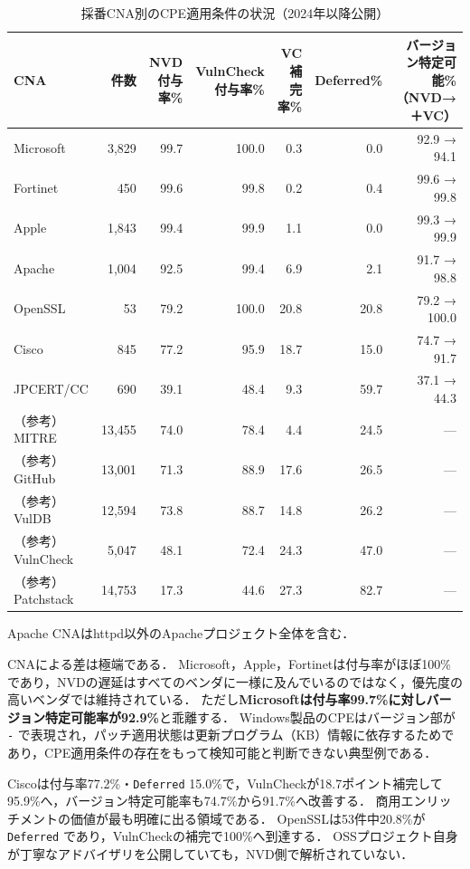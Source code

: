\begin{table}[htbp]
  \caption{採番CNA別のCPE適用条件の状況（2024年以降公開）}
  \label{tab:cna}
  \begin{center}
  \begin{tabular}{lrrrrrr}
    \hline
    CNA & 件数 & NVD付与率\% & VulnCheck付与率\% & VC補完率\% & Deferred\% & バージョン特定可能\%（NVD→＋VC） \\
    \hline
    Microsoft & 3,829 & 99.7 & 100.0 & 0.3 & 0.0 & 92.9 → 94.1 \\
    Fortinet & 450 & 99.6 & 99.8 & 0.2 & 0.4 & 99.6 → 99.8 \\
    Apple & 1,843 & 99.4 & 99.9 & 1.1 & 0.0 & 99.3 → 99.9 \\
    Apache & 1,004 & 92.5 & 99.4 & 6.9 & 2.1 & 91.7 → 98.8 \\
    OpenSSL & 53 & 79.2 & 100.0 & 20.8 & 20.8 & 79.2 → 100.0 \\
    Cisco & 845 & 77.2 & 95.9 & 18.7 & 15.0 & 74.7 → 91.7 \\
    JPCERT/CC & 690 & 39.1 & 48.4 & 9.3 & 59.7 & 37.1 → 44.3 \\
    \hline
    （参考）MITRE & 13,455 & 74.0 & 78.4 & 4.4 & 24.5 & --- \\
    （参考）GitHub & 13,001 & 71.3 & 88.9 & 17.6 & 26.5 & --- \\
    （参考）VulDB & 12,594 & 73.8 & 88.7 & 14.8 & 26.2 & --- \\
    （参考）VulnCheck & 5,047 & 48.1 & 72.4 & 24.3 & 47.0 & --- \\
    （参考）Patchstack & 14,753 & 17.3 & 44.6 & 27.3 & 82.7 & --- \\
    \hline
  \end{tabular}
  \end{center}
  \footnotesize
  Apache CNAはhttpd以外のApacheプロジェクト全体を含む．
\end{table}

CNAによる差は極端である．
Microsoft，Apple，Fortinetは付与率がほぼ100\%であり，NVDの遅延はすべてのベンダに一様に及んでいるのではなく，優先度の高いベンダでは維持されている．
ただし\textbf{Microsoftは付与率99.7\%に対しバージョン特定可能率が92.9\%}と乖離する．
Windows製品のCPEはバージョン部が \texttt{-} で表現され，パッチ適用状態は更新プログラム（KB）情報に依存するためであり，CPE適用条件の存在をもって検知可能と判断できない典型例である．

Ciscoは付与率77.2\%・\texttt{Deferred} 15.0\%で，VulnCheckが18.7ポイント補完して95.9\%へ，バージョン特定可能率も74.7\%から91.7\%へ改善する．
商用エンリッチメントの価値が最も明確に出る領域である．
OpenSSLは53件中20.8\%が \texttt{Deferred} であり，VulnCheckの補完で100\%へ到達する．
OSSプロジェクト自身が丁寧なアドバイザリを公開していても，NVD側で解析されていない．

